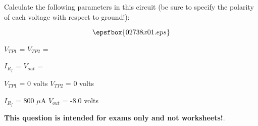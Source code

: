 

Calculate the following parameters in this circuit (be sure to specify the polarity of each voltage with respect to ground!):

$$\epsfbox{02738x01.eps}$$

$V_{TP1}$ = \hskip 80pt $V_{TP2}$ =

\vskip 10pt

$I_{R_f}$ = \hskip 80pt $V_{out}$ =







$V_{TP1}$ = 0 volts \hskip 50pt $V_{TP2}$ = 0 volts

\vskip 10pt

$I_{R_f}$ = 800 $\mu$A \hskip 50pt $V_{out}$ = -8.0 volts







{\bf This question is intended for exams only and not worksheets!}.





